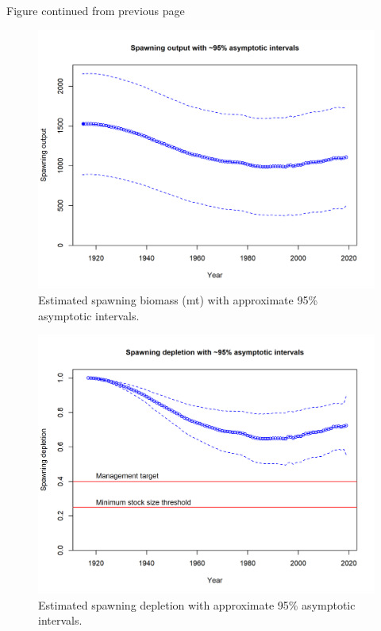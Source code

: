 \documentclass[12pt,]{article}
\begin{document}
\begin{center} 

              Figure continued from previous page 

             \end{center}

\FloatBarrier

\FloatBarrier

\FloatBarrier

\FloatBarrier

\begin{figure}
\centering
\includegraphics{r4ss/plots_mod1/ts7_Spawning_output_with_95_asymptotic_intervals_intervals.png}
\caption{Estimated spawning biomass (mt) with approximate 95\%
asymptotic intervals.
\label{fig:ts7_Spawning_biomass_(mt)_with_95_asymptotic_intervals_intervals}}
\end{figure}

\begin{figure}
\centering
\includegraphics{r4ss/plots_mod1/ts9_Spawning_depletion_with_95_asymptotic_intervals_intervals.png}
\caption{Estimated spawning depletion with approximate 95\% asymptotic
intervals.
\label{fig:ts9_Spawning_depletion_with_95_asymptotic_intervals_intervals}}
\end{figure}
\end{document}

